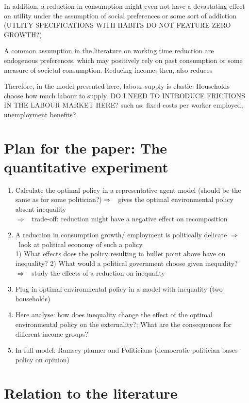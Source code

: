 \documentclass[12pt]{article}
\newcommand{\ar}{$\Rightarrow$ \ }
\begin{document}
In addition, a reduction in consumption might even not have a devastating effect on utility under the assumption of social preferences or some sort of addiction (UTLITY SPECIFICATIONS WITH HABITS DO NOT FEATURE ZERO GROWTH?)


A common assumption in the literature on working time reduction are endogenous preferences, which may positively rely on past consumption or some measure of societal consumption. Reducing income, then, also reduces 


Therefore, in the model presented here, labour supply is elastic. Households choose how much labour to supply. DO I NEED TO INTRODUCE FRICTIONS IN THE LABOUR MARKET HERE? such as: fixed costs per worker employed, unemployment benefits? 



\section{Plan for the paper: The quantitative experiment}
\begin{enumerate}
\item Calculate the optimal policy in a representative agent model (should be the same as for some politician?)\ar gives the optimal environmental policy absent inequality\\
\ar trade-off: reduction might have a negative effect on recomposition


\item A reduction in consumption growth/ employment is politically delicate \ar look at political economy of such a policy. \\
1) What effects does the policy resulting in bullet point above have on inequality?
2) What would a political government choose given inequality? 
\ar study the effects of a reduction on inequality

\item Plug in optimal environmental policy in a model with inequality (two households) 
\item Here analyse: how does inequality change the effect of the optimal environmental policy on the externality?; What are the consequences for different income groups?
\item In full model: Ramsey planner and Politicians (democratic politician bases policy on opinion) 
\end{enumerate}

\section{Relation to the literature}
\end{document}
